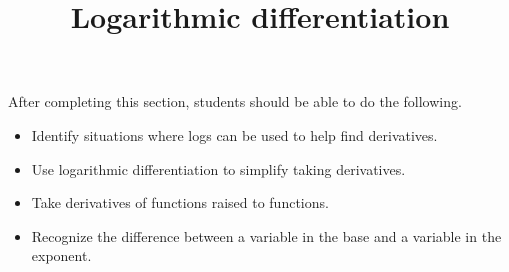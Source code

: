 \documentclass{ximera}
\title{Logarithmic differentiation}
\begin{document}
\begin{abstract}
  
\end{abstract}

\maketitle

\begin{sectionOutcomes}

After completing this section, students should be able to do the following.

\begin{itemize}
	\item Identify situations where logs can be used to help find derivatives.
	\item Use logarithmic differentiation to simplify taking derivatives.
	\item Take derivatives of functions raised to functions.
	\item Recognize the difference between a variable in the base and a variable in the exponent.
\end{itemize}

\end{sectionOutcomes}
\end{document}
